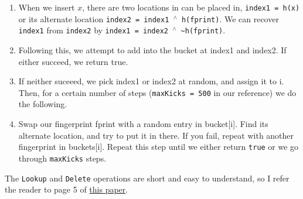 \documentclass[10pt]{amsart}
\begin{document}
\begin{enumerate}
\item When we insert $x$, there are two locations in can be
placed in, \texttt{index1 = h(x)} or its alternate location 
\texttt{index2 = index1 $^\wedge$ h(fprint)}. We can recover \texttt{index1} from 
\texttt{index2} by \texttt{index1 = index2 $^\wedge$ \textasciitilde h(fprint)}.

\item Following this, we attempt to add into the bucket at index1 and index2. If either
succeed, we return true.

\item If neither suceeed, we pick index1 or index2 at random, and assign it to
i. Then, for a certain number of steps (\texttt{maxKicks = 500} in our reference)
we do the following.

\item Swap our fingerprint fprint with a random entry in bucket[i]. Find
its alternate location, and try to put it in there. If you fail, repeat with another
fingerprint in buckets[i]. Repeat this step until we either return \texttt{true}
or we go through \texttt{maxKicks} steps.
\end{enumerate}

The \texttt{Lookup} and \texttt{Delete} operations are short and easy to understand, so
I refer the reader to page 5 of \href{https://www.cs.cmu.edu/~dga/papers/cuckoo-conext2014.pdf}{this paper}.
\end{document}
